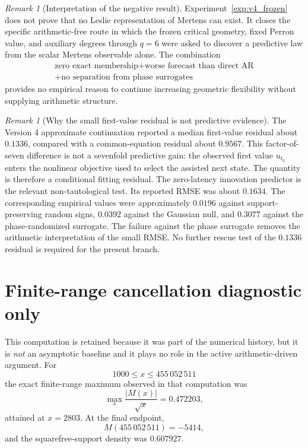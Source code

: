 \documentclass[11pt]{amsart}
\numberwithin{equation}{section}
\theoremstyle{plain}
\theoremstyle{definition}
\theoremstyle{remark}
\newtheorem{remark}[theorem]{Remark}
\begin{document}
\begin{remark}[Interpretation of the negative result]
\label{rem:v4_negative_interpretation}
Experiment~\ref{exp:v4_frozen} does not prove that no Leslie representation of Mertens can
exist.  It closes the specific arithmetic-free route in which the frozen critical geometry,
fixed Perron value, and auxiliary degrees through $q=6$ were asked to discover a predictive law
from the scalar Mertens observable alone.  The combination
\[
\begin{gathered}
\text{zero exact membership}
+\text{worse forecast than direct AR}\\
+\text{no separation from phase surrogates}
\end{gathered}
\]
provides no empirical reason to continue increasing geometric flexibility without supplying
arithmetic structure.
\end{remark}

\begin{remark}[Why the small first-value residual is not predictive evidence]
\label{rem:first_value_residual_contamination}
The Version 4 approximate continuation reported a median first-value residual about $0.1336$,
compared with a common-equation residual about $0.9567$.  This factor-of-seven difference is not
a sevenfold predictive gain: the observed first value $u_{t_0}$ enters the nonlinear objective
used to select the assisted next state.  The quantity is therefore a conditional fitting
residual.  The zero-latency innovation predictor is the relevant non-tautological test.  Its
reported RMSE was about $0.1634$.  The corresponding empirical values were approximately
$0.0196$ against support-preserving random signs, $0.0392$ against the Gaussian null, and
$0.3077$ against the phase-randomized surrogate.  The failure against the phase surrogate removes
the arithmetic interpretation of the small RMSE.  No further rescue test of the $0.1336$ residual
is required for the present branch.
\end{remark}


\section{Finite-range cancellation diagnostic only}
\label{sec:finite_range_envelope}

This computation is retained because it was part of the numerical history, but it is
\emph{not} an asymptotic baseline and it plays no role in the active arithmetic-driven argument.
For
\[
1000\le x\le455\,052\,511
\]
the exact finite-range maximum observed in that computation was
\begin{equation}
\max_x\frac{|M(x)|}{\sqrt x}
=
0.472203,
\label{eq:finite_C_mu}
\end{equation}
attained at $x=2803$.  At the final endpoint,
\[
M(455\,052\,511)=-5414,
\]
and the squarefree-support density was $0.607927$.
\end{document}
